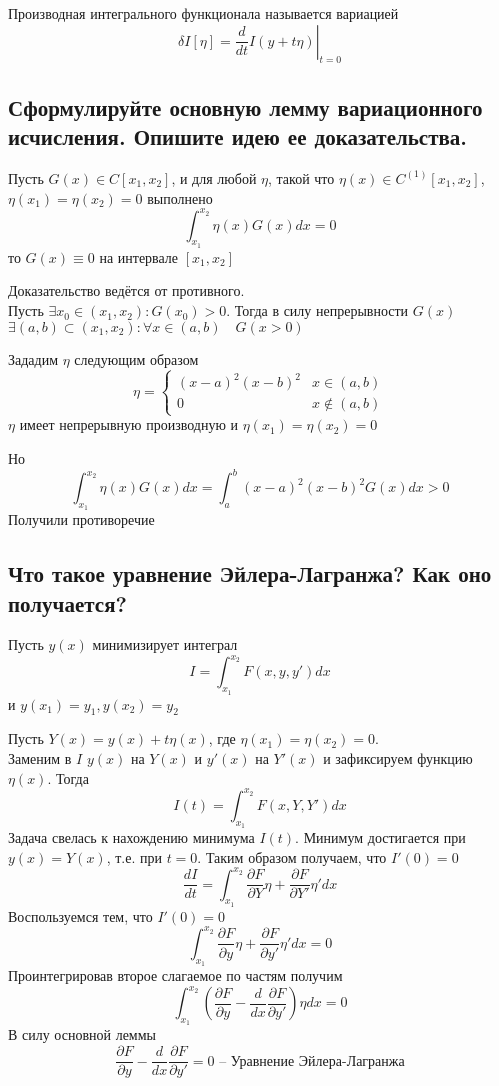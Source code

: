 \documentclass{article}
\begin{document}
Производная интегрального функционала называется вариацией
\[ \delta I[\eta]= \left. \frac{d}{dt}I(y+t\eta) \right|_{t=0} \]

\subsection{Сформулируйте основную лемму вариационного исчисления. Опишите идею ее доказательства.}
Пусть $ G(x) \in C[x_1, x_2] $, и для любой $ \eta $, такой что $ \eta(x) \in C^{(1)}[x_1, x_2] $, $ \eta(x_1)=\eta(x_2)=0 $
выполнено \[ \int_{x_1}^{x_2} \eta(x)G(x)dx = 0 \]
то $ G(x) \equiv 0 $ на интервале $ [x_1, x_2] $

Доказательство ведётся от противного. \\
Пусть $ \exists x_0 \in (x_1, x_2): G(x_0) > 0 $. Тогда в силу непрерывности $ G(x) $ 
$ \exists(a,b)\subset(x_1, x_2): \forall  x \in (a,b) \quad G(x>0) $

Зададим $ \eta $ следующим образом
\[\eta = \left\{
\begin{matrix}
	(x-a)^2(x-b)^2 	& x\in(a,b) \\ 
	0				& x\notin(a,b)
\end{matrix}
\right.
\]
$ \eta $ имеет непрерывную производную и $ \eta(x_1)=\eta(x_2)=0 $

Но 
\[ \int_{x_1}^{x_2} \eta(x)G(x)dx=\int_{a}^{b}(x-a)^2(x-b)^2G(x)dx>0 \]
Получили противоречие 
\subsection{Что такое уравнение Эйлера-Лагранжа? Как оно получается?}
Пусть $y(x)$ минимизирует интеграл 
\[ I = \int_{x_1}^{x_2}F(x, y, y')dx \]
и $ y(x_1)=y_1, y(x_2)=y_2 $

Пусть $Y(x)=y(x)+t\eta(x)$, где $ \eta(x_1)=\eta(x_2)=0 $. \\
Заменим в $I$ $y(x)$ на $Y(x)$ и $y'(x)$ на $Y'(x)$ и зафиксируем функцию $ \eta(x) $. Тогда
\[ I(t) = \int_{x_1}^{x_2}F(x, Y, Y')dx \]
Задача свелась к нахождению минимума $ I(t) $. Минимум достигается при  $y(x)=Y(x)$, т.е. при $ t=0 $. 
Таким образом получаем, что $ I'(0)=0 $
\[ \frac{dI}{dt} = \int_{x_1}^{x_2}\frac{\partial F}{\partial Y} \eta + \frac{\partial F}{\partial Y'}\eta' dx \]
Воспользуемся тем, что $ I'(0)=0 $
\[ \int_{x_1}^{x_2}\frac{\partial F}{\partial y} \eta + \frac{\partial F}{\partial y'}\eta' dx = 0 \]
Проинтегрировав второе слагаемое по частям получим
\[ \int_{x_1}^{x_2}  \left( \frac{\partial F}{\partial y} - \frac{d}{dx}\frac{\partial F}{\partial y'}\right)\eta dx = 0 \]
В силу основной леммы 
\[  \frac{\partial F}{\partial y} - \frac{d}{dx}\frac{\partial F}{\partial y'} =0 \text{ -- Уравнение Эйлера-Лагранжа} \]
\end{document}
